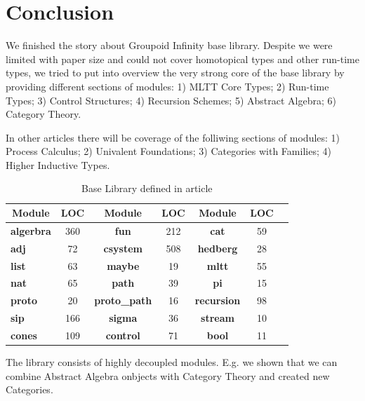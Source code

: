 \documentclass{article}
\newcommand*{\thead}[1]{\multicolumn{1}{c}{\bfseries #1}}
\begin{document}

\newpage
\section{Conclusion}

We finished the story about Groupoid Infinity base library.
Despite we were limited with paper size and could not cover
homotopical types and other run-time types, we tried to put
into overview the very strong core of the base library by
providing different sections of modules:
1) MLTT Core Types;
2) Run-time Types;
3) Control Structures;
4) Recursion Schemes;
5) Abstract Algebra;
6) Category Theory.

In other articles there will be coverage of the folliwing sections of modules:
1) Process Calculus;
2) Univalent Foundations;
3) Categories with Families;
4) Higher Inductive Types.

\begin{table}[h]
\centering
\caption{Base Library defined in article}
\label{tab:a}
\begin{tabular}{lcccccc}
\hline
\thead{Module}&\thead{LOC}&\thead{Module}&\thead{LOC}&\thead{Module}&\thead{LOC} \\
\hline
{\bf algerbra} & 360 & {\bf fun}         & 212 & {\bf cat}       & 59  \\
{\bf adj}      & 72  & {\bf csystem}     & 508 & {\bf hedberg}   & 28  \\
{\bf list}     & 63  & {\bf maybe}       & 19  & {\bf mltt}      & 55  \\
{\bf nat}      & 65  & {\bf path}        & 39  & {\bf pi}        & 15  \\
{\bf proto}    & 20  & {\bf proto\_path} & 16  & {\bf recursion} & 98  \\
{\bf sip}      & 166 & {\bf sigma}       & 36  & {\bf stream}    & 10  \\
{\bf cones}    & 109 & {\bf control}     & 71  & {\bf bool}      & 11  \\
\hline
\end{tabular}
\end{table}

The library consists of highly decoupled modules. E.g. we shown that we can combine
Abstract Algebra onbjects with Category Theory and created new Categories.
\end{document}
